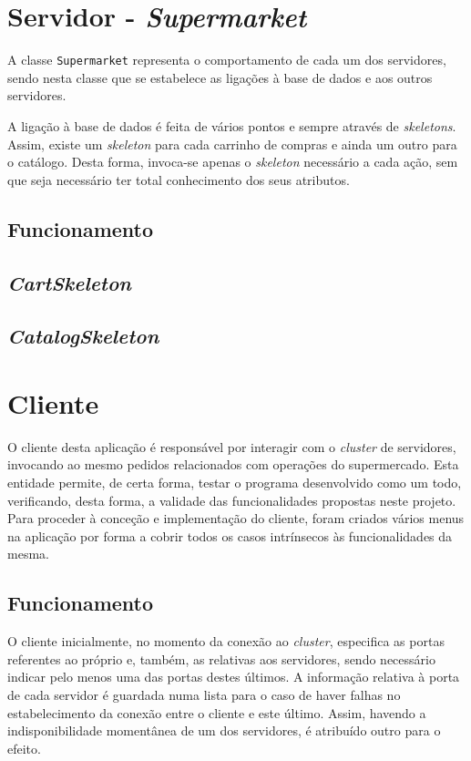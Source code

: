 \documentclass[a4paper]{report}
\begin{document}
{	\section{Servidor - \textit{Supermarket}} \label{sec:Server}
		A classe \texttt{Supermarket} representa o comportamento de cada um dos servidores, sendo nesta classe que se estabelece as ligações à base de dados e aos outros servidores.
		
		A ligação à base de dados é feita de vários pontos e sempre através de \textit{skeletons}. Assim, existe um \textit{skeleton} para cada carrinho de compras e ainda um outro para o catálogo.
		Desta forma, invoca-se apenas o \textit{skeleton} necessário a cada ação, sem que seja necessário ter total conhecimento dos seus atributos.

		\subsection{Funcionamento} \label{subsec:ServerWorking}
		\subsection{\textit{CartSkeleton}} \label{subsec:ServerCartSkeleton}
		\subsection{\textit{CatalogSkeleton}} \label{subsec:ServerCatalogSkeleton}
	
	\section{Cliente} \label{sec:Client}
		O cliente desta aplicação é responsável por interagir com o \textit{cluster} de servidores, invocando ao mesmo pedidos relacionados com operações do supermercado.
		Esta entidade permite, de certa forma, testar o programa desenvolvido como um todo, verificando, desta forma, a validade das funcionalidades propostas neste projeto.
		Para proceder à conceção e implementação do cliente, foram criados vários menus na aplicação por forma a cobrir todos os casos intrínsecos às funcionalidades da mesma.

		\subsection{Funcionamento} \label{subsec:ClientWorking}
		O cliente inicialmente, no momento da conexão ao \textit{cluster}, especifica as portas referentes ao próprio e, também, as relativas aos servidores, sendo necessário indicar pelo menos uma das portas destes últimos.
		A informação relativa à porta de cada servidor é guardada numa lista para o caso de haver falhas no estabelecimento da conexão entre o cliente e este último. Assim, havendo a indisponibilidade momentânea de um dos servidores, é atribuído outro para o efeito.

}
\end{document}

